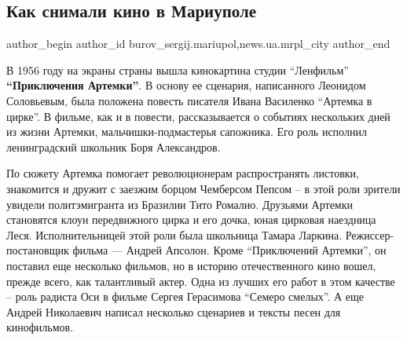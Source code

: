  
 
 
 
 
 
\subsection{Как снимали кино в Мариуполе}
\label{sec:29_06_2019.stz.news.ua.mrpl_city.1.kak_snimali_kino_v_mariupole}
 
\ifcmt
 author_begin
   author_id burov_sergij.mariupol,news.ua.mrpl_city
 author_end
\fi


В 1956 году на экраны страны вышла кинокартина студии \enquote{Ленфильм} \textbf{\enquote{Приключения
Артемки}}. В основу ее сценария, написанного Леонидом Соловьевым, была положена
повесть писателя Ивана Василенко \enquote{Артемка в цирке}. В фильме, как и в повести,
рассказывается о событиях нескольких дней из жизни Артемки,
мальчишки-подмастерья сапожника. Его роль исполнил ленинградский школьник Боря
Александров.

По сюжету  Артемка помогает революционерам распространять листовки, знакомится
и дружит с заезжим борцом Чемберсом Пепсом – в этой роли зрители увидели
политэмигранта из Бразилии Тито Ромалио. Друзьями Артемки становятся клоун
передвижного цирка и его дочка, юная цирковая наездница Леся. Исполнительницей
этой роли была школьница Тамара Ларкина. Режиссер-постановщик фильма — Андрей
Апсолон. Кроме \enquote{Приключений Артемки}, он поставил еще несколько фильмов, но в
историю отечественного кино вошел, прежде всего, как талантливый актер. Одна из
лучших его работ в этом качестве – роль радиста Оси в фильме Сергея Герасимова
\enquote{Семеро смелых}. А еще Андрей Николаевич написал несколько сценариев и тексты
песен для  кинофильмов.


